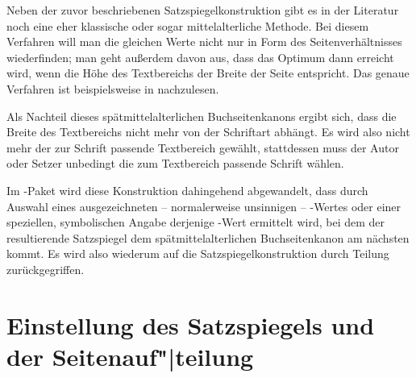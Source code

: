 \begin{Explain}
  Neben der zuvor beschriebenen Satzspiegelkonstruktion
  gibt es in der Literatur noch eine eher klassische oder sogar
  mittelalterliche Methode. Bei diesem Verfahren will man die gleichen Werte
  nicht nur in Form des Seitenverhältnisses wiederfinden; man geht außerdem
  davon aus, dass das Optimum dann erreicht wird, wenn die Höhe des
  Textbereichs der Breite der Seite entspricht. Das genaue Verfahren ist
  beispielsweise in \cite{JTsch87} nachzulesen.

  Als Nachteil dieses spätmittelalterlichen Buchseitenkanons ergibt sich, dass
  die Breite des Textbereichs nicht mehr von der Schriftart abhängt. Es wird
  also nicht mehr der zur Schrift passende Textbereich gewählt, stattdessen
  muss der Autor oder Setzer unbedingt die zum Textbereich passende Schrift
  wählen.
%
\iffalse
  Dies ist als zwingend zu betrachten.
\fi

  Im -Paket wird diese Konstruktion dahingehend abgewandelt,
  dass durch Auswahl eines ausgezeichneten -- normalerweise unsinnigen --
  -Wertes oder einer speziellen, symbolischen Angabe derjenige
  -Wert ermittelt wird, bei dem der resultierende Satzspiegel dem
  spätmittelalterlichen Buchseitenkanon am nächsten kommt. Es wird also
  wiederum auf die Satzspiegelkonstruktion durch Teilung zurückgegriffen.
%
\iffalse
  Bei Wahl einer guten Schrift stimmt dieses Ergebnis nicht selten mit der
  Suche nach dem optimalen \Var{DIV}-Wert überein. Siehe hierzu ebenfalls
  \autoref{sec:typearea.typearea}, \DescPageRef{typearea.option.DIV.calc}.
%
\fi
\end{Explain}



\section{Einstellung des Satzspiegels und der \texorpdfstring{Seitenauf"|teilung}{Seitenaufteilung}}

